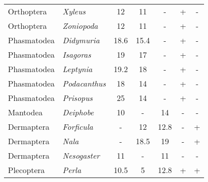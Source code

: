 \begin{table}
\begin{tabular}{llccccc}
Orthoptera             & \textit{Xyleus}                 & 12                          & 11                          & -                            & +                 & -                 \\
Orthoptera             & \textit{Zoniopoda}              & 12                          & 11                          & -                            & +                 & -                 \\
Phasmatodea            & \textit{Didymuria}              & 18.6                        & 15.4                        & -                            & +                 & -                 \\
Phasmatodea            & \textit{Isagoras}               & 19                          & 17                          & -                            & +                 & -                 \\
Phasmatodea            & \textit{Leptynia}               & 19.2                        & 18                          & -                            & +                 & -                 \\
Phasmatodea            & \textit{Podacanthus}            & 18                          & 14                          & -                            & +                 & -                 \\
Phasmatodea            & \textit{Prisopus}               & 25                          & 14                          & -                            & +                 & -                 \\
Mantodea               & \textit{Deiphobe}               & 10                          & -                           & 14                           & -                 & -                 \\
Dermaptera             & \textit{Forficula}              & -                           & 12                          & 12.8                         & -                 & +                 \\
Dermaptera             & \textit{Nala}                   & -                           & 18.5                        & 19                           & -                 & +                 \\
Dermaptera             & \textit{Nesogaster}             & 11                          & -                           & 11                           & -                 & -                 \\
Plecoptera             & \textit{Perla}                  & 10.5                        & 5                           & 12.8                         & +                 & +                 \\ \hline

\end{tabular}
\end{table}
